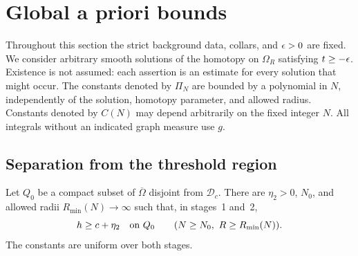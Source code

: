 \section{Global a priori bounds}\label{four:maximal:sec:bounds}

Throughout this section the strict background data, collars, and
$\epsilon>0$ are fixed. We consider arbitrary smooth solutions of the
homotopy on $\Omega_R$ satisfying $t\ge-\epsilon$. Existence is not assumed:
each assertion is an estimate for every solution that might occur.
The constants denoted by $\Pi_N$ are bounded by a polynomial in $N$,
independently of the solution, homotopy parameter, and allowed radius.
Constants denoted by $C(N)$ may depend arbitrarily on the fixed integer
$N$. All integrals without an indicated graph measure use $g$.

\subsection{Separation from the threshold region}

\begin{lemma}\label{four:maximal:lem:separation}
Let $Q_0$ be a compact subset of $\overline\Omega$ disjoint from
$\mathcal D_c$. There are $\eta_2>0$, $N_0$, and allowed radii
$R_{\min}(N)\to\infty$ such that, in stages~1 and~2,
\begin{equation}\label{four:maximal:bounds:separation}
 h\ge c+\eta_2\quad\hbox{on }Q_0
 \qquad(N\ge N_0,\ R\ge R_{\min}(N)).
\end{equation}
The constants are uniform over both stages.
\end{lemma}

